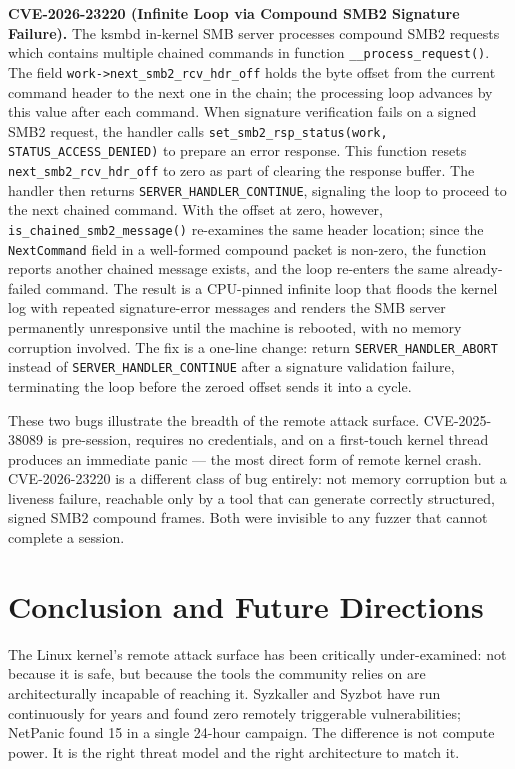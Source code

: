 \documentclass[10pt]{article}
\begin{document}
\textbf{CVE-2026-23220 (Infinite Loop via Compound SMB2 Signature Failure).}
The ksmbd in-kernel SMB server processes compound SMB2 requests which contains multiple chained commands in function \texttt{\_\_process\_request()}. The field \texttt{work->next\_smb2\_rcv\_hdr\_off} holds the byte offset from the current command header to the next one in the chain; the processing loop advances by this value after each command. When signature verification fails on a signed SMB2 request, the handler calls \texttt{set\_smb2\_rsp\_status(work, STATUS\_ACCESS\_DENIED)} to prepare an error response. This function resets \texttt{next\_smb2\_rcv\_hdr\_off} to zero as part of clearing the response buffer. The handler then returns \texttt{SERVER\_HANDLER\_CONTINUE}, signaling the loop to proceed to the next chained command. With the offset at zero, however, \texttt{is\_chained\_smb2\_message()} re-examines the same header location; since the \texttt{NextCommand} field in a well-formed compound packet is non-zero, the function reports another chained message exists, and the loop re-enters the same already-failed command. The result is a CPU-pinned infinite loop that floods the kernel log with repeated signature-error messages and renders the SMB server permanently unresponsive until the machine is rebooted, with no memory corruption involved. The fix is a one-line change: return \texttt{SERVER\_HANDLER\_ABORT} instead of \texttt{SERVER\_HANDLER\_CONTINUE} after a signature validation failure, terminating the loop before the zeroed offset sends it into a cycle.

These two bugs illustrate the breadth of the remote attack surface. CVE-2025-38089 is pre-session, requires no credentials, and on a first-touch kernel thread produces an immediate panic --- the most direct form of remote kernel crash. CVE-2026-23220 is a different class of bug entirely: not memory corruption but a liveness failure, reachable only by a tool that can generate correctly structured, signed SMB2 compound frames. Both were invisible to any fuzzer that cannot complete a session.

\section{Conclusion and Future Directions}

The Linux kernel's remote attack surface has been critically under-examined: not because it is safe, but because the tools the community relies on are architecturally incapable of reaching it. Syzkaller and Syzbot have run continuously for years and found zero remotely triggerable vulnerabilities; NetPanic found 15 in a single 24-hour campaign. The difference is not compute power. It is the right threat model and the right architecture to match it.
\end{document}
